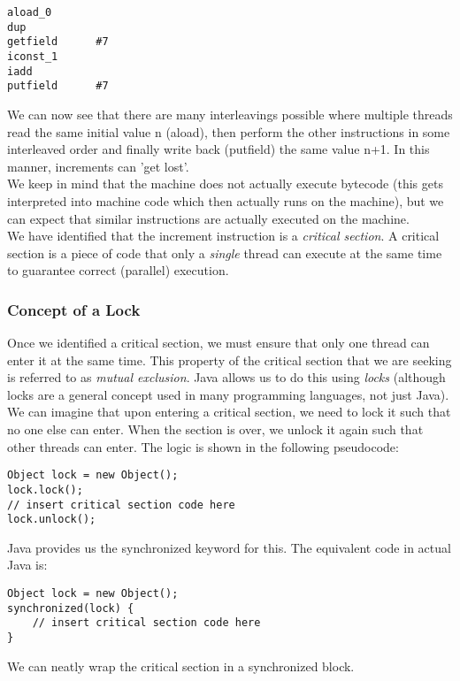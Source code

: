 \documentclass[main.tex]{subfiles}
\begin{document}
\begin{verbatim}
aload_0
dup
getfield      #7
iconst_1
iadd
putfield      #7
\end{verbatim}
We can now see that there are many interleavings possible where multiple threads read the same initial value n (aload), then perform the other instructions in some interleaved order and finally write back (putfield) the same value n+1. In this manner, increments can 'get lost'.\\
We keep in mind that the machine does not actually execute bytecode (this gets interpreted into machine code which then actually runs on the machine), but we can expect that similar instructions are actually executed on the machine.\\[3mm]
We have identified that the increment instruction is a \textit{critical section}. A critical section is a piece of code that only a \textit{single} thread can execute at the same time to guarantee correct (parallel) execution.

\subsubsection{Concept of a Lock}


Once we identified a critical section, we must ensure that only one thread can enter it at the same time. This property of the critical section that we are seeking is referred to as \textit{mutual exclusion}. Java allows us to do this using \textit{locks} (although locks are a general concept used in many programming languages, not just Java).\\
We can imagine that upon entering a critical section, we need to lock it such that no one else can enter. When the section is over, we unlock it again such that other threads can enter. The logic is shown in the following pseudocode:
\begin{verbatim}
Object lock = new Object();
lock.lock();
// insert critical section code here
lock.unlock();
\end{verbatim}
Java provides us the synchronized keyword for this. The equivalent code in actual Java is:
\begin{verbatim}
Object lock = new Object();
synchronized(lock) {
    // insert critical section code here
}
\end{verbatim}
We can neatly wrap the critical section in a synchronized block.
\end{document}
